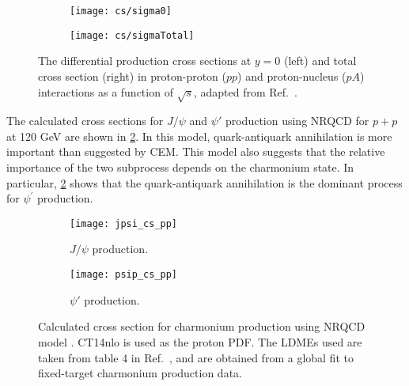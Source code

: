 \documentclass[../main.tex]{subfiles}
\begin{document}
\begin{figure}[ht!]
	\centering
	\begin{subfigure}{0.45\linewidth}
		\texttt{[image: cs/sigma0]}
	\end{subfigure}
	\begin{subfigure}{0.45\linewidth}
		\texttt{[image: cs/sigmaTotal]}
	\end{subfigure}
	\caption{The differential production cross sections at $y=0$ (left) and total 
		cross section (right) in proton-proton ($pp$) and proton-nucleus ($pA$) interactions
		as a function of $\sqrt{s}$, adapted from Ref.~\cite{maltoni2006}.}
	\label{fig:charm_cs}
\end{figure}






The calculated cross sections for $J/\psi$ and $\psi'$ production using NRQCD for
$p+p$ at 120 GeV are shown in \cref{fig:NRQCD_cs}. In this model, quark-antiquark
annihilation is more important than suggested by CEM. This model also suggests
that the relative importance of the two subprocess depends on the charmonium state.
In particular, \cref{fig:NRQCD_cs} shows that the quark-antiquark annihilation
is the dominant process for $\psi^\prime$ production.
\begin{figure}[h!]
	\centering
	\begin{subfigure}{0.45\linewidth}
		\texttt{[image: jpsi\_cs\_pp]}
		\caption{$J/\psi$ production.}
	\end{subfigure}
	\quad
	\begin{subfigure}{0.45\linewidth}
		\texttt{[image: psip\_cs\_pp]}
		\caption{$\psi'$ production.}
	\end{subfigure}
	\caption{Calculated cross section for charmonium production using NRQCD model
		\cite{chang2021}. CT14nlo is used as the proton PDF. The LDMEs used are
		taken from table \num{4} in Ref.~\cite{hsieh2021}, and are obtained from a
		global fit to fixed-target charmonium production data. }
	\label{fig:NRQCD_cs}
\end{figure}



\ifSubfilesClassLoaded{ \printbibliography[heading=bibintoc,title={References}]}{}
\end{document}
